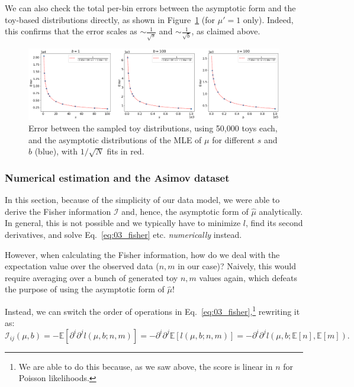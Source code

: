 We can also check the total per-bin errors between the asymptotic form and the toy-based distributions directly, as shown in Figure~\ref{fig:03_mle_errors} (for $\mu' = 1$ only).
Indeed, this confirms that the error scales as $\sim \frac{1}{\sqrt{s}}$ and $\sim \frac{1}{\sqrt{b}}$, as claimed above.

\begin{figure}[htb]
\centering
\includegraphics[width=\textwidth]{figures/03-Stats/05-asymptotic-mle/5.png}
\caption{Error between the sampled toy distributions, using 50,000 toys each, and the asymptotic distributions of the MLE of $\mu$ for different $s$ and $b$ (blue), with $1/\sqrt{N}$ fits in red.}
\label{fig:03_mle_errors}
\end{figure}


\subsubsection{Numerical estimation and the Asimov dataset}
\label{sec:03_pmle_asimov}

In this section, because of the simplicity of our data model, we were able to derive the Fisher information $\mathcal I$ and, hence, the asymptotic form of $\hat \mu$ analytically.
In general, this is not possible and we typically have to minimize $l$, find its second derivatives, and solve Eq.~\ref{eq:03_fisher} etc. \textit{numerically} instead.

However, when calculating the Fisher information, how do we deal with the expectation value over the observed data ($n, m$ in our case)? Naively, this would require averaging over a bunch of generated toy $n, m$ values again, which defeats the purpose of using the asymptotic form of $\hat \mu$!

Instead, we can switch the order of operations in Eq.~\ref{eq:03_fisher},\footnote{We are able to do this because, as we saw above, the score is linear in $n$ for Poisson likelihoods.} rewriting it as:
\begin{equation}
  \mathcal I_{ij}(\mu, b) = - \mathbb E[\partial^i\partial^j l(\mu, b; n, m)] = - \partial^i\partial^j \mathbb E[l(\mu, b; n, m)] = -\partial^i\partial^j l(\mu, b; \mathbb E[n], \mathbb E[m]).
\label{eq:03_fisher_asimov}
\end{equation}

